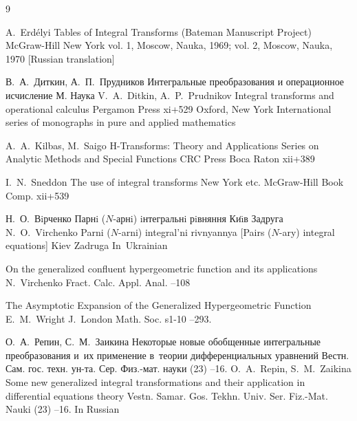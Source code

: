\begin{thebibliography}{9}

\by A.~Erd\'elyi
\book Tables of Integral Transforms \rm (Bateman Manuscript Project) 
\publ McGraw-Hill
\publaddr New York
\miscnote vol. 1, Moscow, Nauka,  1969; vol. 2, Moscow, Nauka, 1970 [Russian translation]


\by В.~А.~Диткин, А.~П.~Прудников
\book Интегральные преобразования и операционное исчисление
\publaddr М.
\publ Наука
\transl 
\by V.~A.~Ditkin, A.~P.~Prudnikov
\book Integral transforms and operational calculus
\publ Pergamon Press
\totalpages xi+529
\publaddr  	Oxford, New York 
\serial International series of monographs in pure and applied mathematics

\by A.~A.~Kilbas, M.~Saigo
\book  H-Transforms: Theory and Applications
\serial Series on Analytic Methods and Special Functions
\publ CRC Press
\publaddr Boca Raton 
\totalpages  xii+389



\by I.~N.~Sneddon
\book The use of integral transforms
\publaddr New York etc.
\publ McGraw-Hill Book Comp. 
\totalpages xii+539 

\by Н.~О.~Вiрченко
\book Парнi ($N$-арнi) iнтегральнi рiвняння
\publaddr Ки\"\i{}в
\publ Задруга
\misctransl
\by N.~O.~Virchenko
\book Parni ($N$-arni) integral'ni rivnyannya \rm [Pairs ($N$-ary) integral equations]
\publaddr Kiev
\publ Zadruga
\lang In~Ukrainian

\paper On the generalized confluent hypergeometric function and its applications
\by N.~Virchenko
\jour Fract. Calc. Appl. Anal.
--108

\paper The Asymptotic Expansion of the Generalized Hypergeometric Function
\by E.~M.~Wright
\jour J.~London Math. Soc.
\vol s1-10
--293.

\by О.~А.~Репин, С.~М.~Заикина
\paper Некоторые новые обобщенные интегральные преобразования и~их применение в~теории дифференциальных уравнений
\jour Вестн. Сам. гос. техн. ун-та. Сер. Физ.-мат. науки
(23)
--16.
\misctransl
\by O.~A.~Repin, S.~M.~Zaikina
\paper Some new generalized integral transformations and their application in differential equations theory
\jour Vestn. Samar. Gos. Tekhn. Univ. Ser. Fiz.-Mat. Nauki
(23)
--16.
\lang In Russian


\end{thebibliography}
